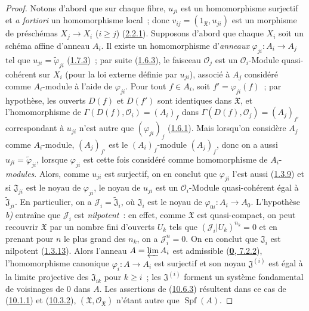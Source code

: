 \begin{proof}
Notons d'abord que sur chaque fibre, $u_{ji}$ est un homomorphisme
surjectif et \emph{a fortiori} un homomorphisme local~; donc
$v_{ij}=(1_{\mathfrak{X}},u_{ji})$ est un morphisme de préschémas
$X_j\to X_i$ ($i\geq j$) (\hyperref[I.2.2.1-fr]{2.2.1}). Supposons
d'abord que chaque $X_i$ soit un schéma affine d'anneau $A_i$. Il existe
un homomorphisme d'\emph{anneaux}
$\varphi_{ji}:A_i\to A_j$ tel que
$u_{ji}=\widetilde{\varphi}_{ji}$
(\hyperref[I.1.7.3-fr]{1.7.3})~; par suite
(\hyperref[I.1.6.3-fr]{1.6.3}), le faisceau $\mathscr{O}_j$ est un
$\mathscr{O}_i$-Module quasi-cohérent sur $X_i$ (pour la loi externe
définie par $u_{ji}$), associé à $A_j$ considéré comme $A_i$-module à
l'aide de $\varphi_{ji}$. Pour tout $f\in A_i$, soit
$f'=\varphi_{ji}(f)$~; par hypothèse, les ouverts $D(f)$ et $D(f')$ sont
identiques dans $\mathfrak{X}$, et l'homomorphisme de
$\Gamma(D(f),\mathscr{O}_i)=(A_i)_f$ dans
$\Gamma(D(f),\mathscr{O}_j)=(A_j)_{f'}$ correspondant à $u_{ji}$ n'est
autre que $(\varphi_{ji})_f$ (\hyperref[I.1.6.1-fr]{1.6.1}). Mais
lorsqu'on considère $A_j$ comme $A_i$-module, $(A_j)_{f'}$ est le
$(A_i)_f$-module $(A_j)_f$, donc on a aussi
$u_{ji}=\widetilde{\varphi}_{ji}$, lorsque $\varphi_{ji}$ est cette fois
considéré comme homomorphisme de $A_i$-\emph{modules}. Alors, comme $u_{ji}$ est
surjectif, on en conclut que $\varphi_{ji}$ l'est aussi
(\hyperref[I.1.3.9-fr]{1.3.9}) et si $\mathfrak{J}_{ji}$ est le noyau de
$\varphi_{ji}$, le noyau de $u_{ji}$ est un $\mathscr{O}_i$-Module
quasi-cohérent égal à $\widetilde{\mathfrak{J}}_{ji}$. En particulier,
on a $\mathscr{J}_i=\widetilde{\mathfrak{J}}_i$, où $\mathfrak{J}_i$ est
le noyau de $\varphi_{0i}:A_i\to A_0$. L'hypothèse \emph{b)} entraîne que
$\mathscr{J}_i$ est \emph{nilpotent}~: en effet, comme $\mathfrak{X}$
est quasi-compact, on peut recouvrir $\mathfrak{X}$ par un nombre fini
d'ouverts $U_k$ tels que $(\mathscr{J}_i|U_k)^{n_k}=0$ et en prenant pour
$n$ le plus grand des $n_k$, on a $\mathscr{J}_i^n=0$. On en conclut que
$\mathfrak{J}_i$ est nilpotent (\hyperref[I.1.3.13-fr]{1.3.13}). Alors
l'anneau $A=\varprojlim A_i$ est admissible
(\hyperref[0.7.2.2-fr]{\textbf{0}, 7.2.2}), l'homomorphisme canonique
$\varphi_i:A\to A_i$ est surjectif et son noyau
$\mathfrak{J}^{(i)}$ est égal à la limite projective des
$\mathfrak{J}_{ik}$ pour $k\geq i$~; les $\mathfrak{J}^{(i)}$ forment
un système fondamental de voisinages de 0 dans $A$. Les assertions de
(\hyperref[I.10.6.3-fr]{10.6.3}) résultent dans ce cas de
(\hyperref[I.10.1.1-fr]{10.1.1}) et
(\hyperref[I.10.3.2-fr]{10.3.2}),
$(\mathfrak{X},\mathscr{O}_{\mathfrak{X}})$ n'étant autre que
$\operatorname{Spf}(A)$.


\end{proof}
